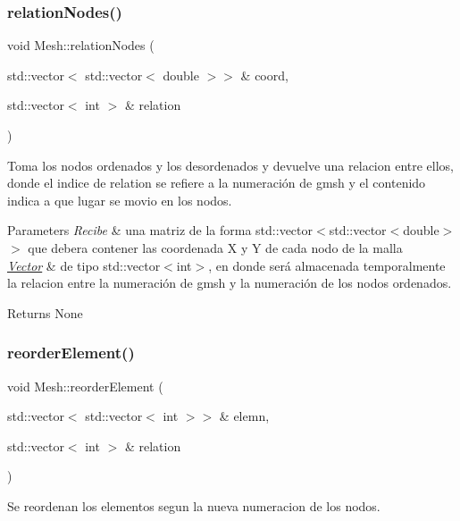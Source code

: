 \subsubsection{\texorpdfstring{relation\+Nodes()}{relationNodes()}}
{\footnotesize\ttfamily void Mesh\+::relation\+Nodes (\begin{DoxyParamCaption}\item[{std\+::vector$<$ std\+::vector$<$ double $>$$>$ \&}]{coord,  }\item[{std\+::vector$<$ int $>$ \&}]{relation }\end{DoxyParamCaption})}



Toma los nodos ordenados y los desordenados y devuelve una relacion entre ellos, donde el indice de relation se refiere a la numeración de gmsh y el contenido indica a que lugar se movio en los nodos. 


\begin{DoxyParams}{Parameters}
{\em Recibe} & una matriz de la forma std\+::vector$<$std\+::vector$<$double$>$$>$ que debera contener las coordenada X y Y de cada nodo de la malla \\
\hline
{\em \hyperlink{class_vector}{Vector}} & de tipo std\+::vector$<$int$>$, en donde será almacenada temporalmente la relacion entre la numeración de gmsh y la numeración de los nodos ordenados. \\
\hline
\end{DoxyParams}
\begin{DoxyReturn}{Returns}
None 
\end{DoxyReturn}
\hypertarget{class_mesh_a7972a36435ea43732b4611a3765c28f6}{}\label{class_mesh_a7972a36435ea43732b4611a3765c28f6} 
\subsubsection{\texorpdfstring{reorder\+Element()}{reorderElement()}}
{\footnotesize\ttfamily void Mesh\+::reorder\+Element (\begin{DoxyParamCaption}\item[{std\+::vector$<$ std\+::vector$<$ int $>$$>$ \&}]{elemn,  }\item[{std\+::vector$<$ int $>$ \&}]{relation }\end{DoxyParamCaption})}



Se reordenan los elementos segun la nueva numeracion de los nodos. 


